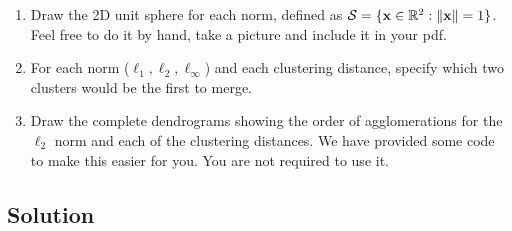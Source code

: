 \documentclass[submit]{harvardml}
\begin{document}
\begin{problem}
  \begin{enumerate}
  \item Draw the 2D unit sphere for each norm,
  defined as $\mathcal{S} = \{\mathbf{x} \in \mathbb{R}^2: \|\mathbf{x}\| = 1 \}$. Feel free to do
  it by hand, take a picture and include it in your pdf.
\item  For each norm ($\ell_1, \ell_2, \ell_\infty$) and each clustering distance, specify which two clusters would
  be the first to merge.
\item Draw the complete dendrograms showing the order of agglomerations for the $\ell_2$ norm and each of the clustering distances. We have provided some code to make this easier for you. You are not required to use it.
  \end{enumerate}


\end{problem}

\subsection*{Solution}

\newpage 
\end{document}

